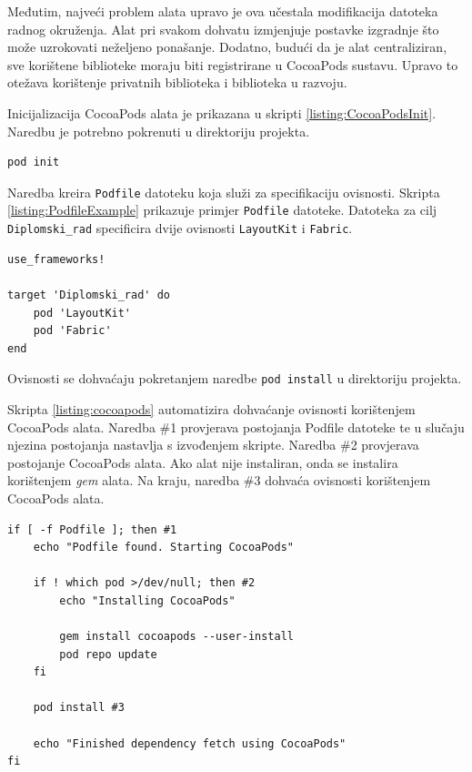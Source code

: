 \documentclass[times, utf8, diplomski, numeric]{fer}
\begin{document}
Međutim, najveći problem alata upravo je ova učestala modifikacija datoteka radnog okruženja. Alat pri svakom dohvatu izmjenjuje postavke izgradnje što može uzrokovati neželjeno ponašanje. Dodatno, budući da je alat centraliziran, sve korištene biblioteke moraju biti registrirane u CocoaPods sustavu. Upravo to otežava korištenje privatnih biblioteka i biblioteka u razvoju.

Inicijalizacija CocoaPods alata je prikazana u skripti \ref{listing:CocoaPodsInit}. Naredbu je potrebno pokrenuti u direktoriju projekta.

\begin{lstlisting}[caption=Inicijalizacija CocoaPods alata, label=listing:CocoaPodsInit]
pod init
\end{lstlisting}

Naredba kreira \verb|Podfile| datoteku koja služi za specifikaciju ovisnosti. Skripta \ref{listing:PodfileExample} prikazuje primjer \verb|Podfile| datoteke. Datoteka za cilj \verb|Diplomski_rad| specificira dvije ovisnosti \verb|LayoutKit| i \verb|Fabric|.

\begin{lstlisting}[caption=Primjer Podfile datoteke, label=listing:PodfileExample]
use_frameworks!

target 'Diplomski_rad' do
    pod 'LayoutKit'
    pod 'Fabric'
end
\end{lstlisting}

Ovisnosti se dohvaćaju pokretanjem naredbe \verb|pod install| u direktoriju projekta.

Skripta \ref{listing:cocoapods} automatizira dohvaćanje ovisnosti korištenjem CocoaPods alata. Naredba \#1 provjerava postojanja Podfile datoteke te u slučaju njezina postojanja nastavlja s izvođenjem skripte. Naredba \#2 provjerava postojanje CocoaPods alata. Ako alat nije instaliran, onda se instalira korištenjem \textit{gem} alata. Na kraju, naredba \#3 dohvaća ovisnosti korištenjem CocoaPods alata.

\begin{lstlisting}[caption=Dohvat ovisnosti korištenjem alata CocoaPods, label=listing:cocoapods]
if [ -f Podfile ]; then #1
    echo "Podfile found. Starting CocoaPods"

    if ! which pod >/dev/null; then #2
        echo "Installing CocoaPods"

        gem install cocoapods --user-install
        pod repo update
    fi

    pod install #3

    echo "Finished dependency fetch using CocoaPods"
fi
\end{lstlisting}
\end{document}
